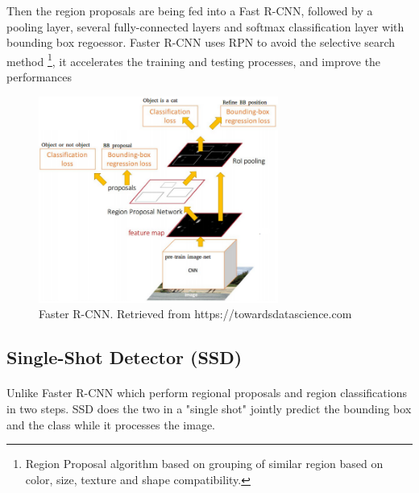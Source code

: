 \documentclass[12pt]{report}
\begin{document}
                Then the region proposals are being fed into a Fast R-CNN, followed by a pooling layer, several fully-connected layers
                and softmax classification layer with bounding box regoessor.
                Faster R-CNN uses RPN to avoid the 
                selective search method \footnote{ Region Proposal algorithm based on grouping of similar region based on color, size, texture and shape compatibility.}, 
                it accelerates the training and testing 
                processes, and improve the performances \cite{Ren2017a}
                    \begin{figure}[h]
                    \centering
                    \includegraphics[width=0.7\textwidth]{./images/frcnn.png}
                    \caption{Faster R-CNN. Retrieved from https://towardsdatascience.com}
                    \label{fig:frcnn}
                    \end{figure} 

                \subsection{Single-Shot Detector (SSD)}
                \paragraph{}
                    Unlike Faster R-CNN which perform regional proposals 
                    and region classifications in two steps. SSD does the two in a "single shot"
                    jointly predict the bounding box and the class while it processes the image.
\end{document}
